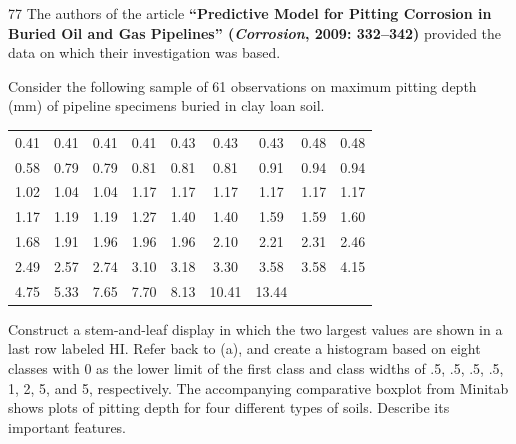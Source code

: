 \documentclass{exam}
\begin{document}
\begin{problem}{77}
	The authors of the article \textbf{``Predictive Model for Pitting Corrosion in Buried Oil and Gas Pipelines'' (\textit{Corrosion}, 2009: 332--342)} provided the data on which their investigation was based.
	\begin{tasks}[label=\textbf{\alph*.}]
		\task Consider the following sample of 61 observations on maximum pitting depth (mm) of pipeline specimens buried in clay loan soil.
		\begin{center}
			\begin{tabular}{ccccccccc}
				0.41 & 0.41 & 0.41 & 0.41 & 0.43 & 0.43 & 0.43 & 0.48 & 0.48 \\
				0.58 & 0.79 & 0.79 & 0.81 & 0.81 & 0.81 & 0.91 & 0.94 & 0.94 \\
				1.02 & 1.04 & 1.04 & 1.17 & 1.17 & 1.17 & 1.17 & 1.17 & 1.17 \\
				1.17 & 1.19 & 1.19 & 1.27 & 1.40 & 1.40 & 1.59 & 1.59 & 1.60 \\
				1.68 & 1.91 & 1.96 & 1.96 & 1.96 & 2.10 & 2.21 & 2.31 & 2.46 \\
				2.49 & 2.57 & 2.74 & 3.10 & 3.18 & 3.30 & 3.58 & 3.58 & 4.15 \\
				4.75 & 5.33 & 7.65 & 7.70 & 8.13 & 10.41 & 13.44
			\end{tabular}
		\end{center}
		Construct a stem-and-leaf display in which the two largest values are shown in a last row labeled HI.
		\task Refer back to (a), and create a histogram based on eight classes with 0 as the lower limit of the first class and class widths of .5, .5, .5, .5, 1, 2, 5, and 5, respectively.
		\task The accompanying comparative boxplot from Minitab shows plots of pitting depth for four different types of soils. Describe its important features.
	\end{tasks}
\end{problem}
\end{document}
